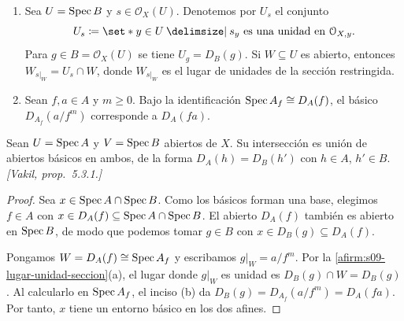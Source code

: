 \begin{afirm}
\label{afirm:s09-lugar-unidad-seccion}
\begin{enumerate}[label=(\alph*)]
\item Sea $U=\operatorname{Spec} B$ y $s\in\mathcal O_X(U)$. Denotemos por $U_s$ el conjunto
\[
U_s\coloneqq\set*{y\in U\given s_y\text{ es una unidad en }\mathcal O_{X,y}}.
\]
Para $g\in B=\mathcal O_X(U)$ se tiene $U_g=D_B(g)$. Si $W\subseteq U$ es abierto, entonces $W_{s|_W}=U_s\cap W$, donde $W_{s|_W}$ es el lugar de unidades de la sección restringida.
\item Sean $f,a\in A$ y $m\ge0$. Bajo la identificación $\operatorname{Spec} A_f\cong D_A(f)$, el básico $D_{A_f}(a/f^m)$ corresponde a $D_A(fa)$.
\end{enumerate}
\end{afirm}

\begin{lema}
\label{lema:s09-interseccion-afines}
Sean $U=\operatorname{Spec} A$ y $V=\operatorname{Spec} B$ abiertos de $X$. Su intersección es unión de abiertos básicos en ambos, de la forma $D_A(h)=D_B(h')$ con $h\in A$, $h'\in B$. \emph{[Vakil, prop.~5.3.1.]}
\end{lema}
\begin{proof}
Sea $x\in\operatorname{Spec} A\cap\operatorname{Spec} B$. Como los básicos forman una base, elegimos $f\in A$ con $x\in D_A(f)\subseteq\operatorname{Spec} A\cap\operatorname{Spec} B$. El abierto $D_A(f)$ también es abierto en $\operatorname{Spec} B$, de modo que podemos tomar $g\in B$ con $x\in D_B(g)\subseteq D_A(f)$.

Pongamos $W=D_A(f)\cong\operatorname{Spec} A_f$ y escribamos $g|_W=a/f^m$. Por la \cref{afirm:s09-lugar-unidad-seccion}(a), el lugar donde $g|_W$ es unidad es $D_B(g)\cap W=D_B(g)$. Al calcularlo en $\operatorname{Spec} A_f$, el inciso (b) da $D_B(g)=D_{A_f}(a/f^m)=D_A(fa)$. Por tanto, $x$ tiene un entorno básico en los dos afines.
\end{proof}

\begin{center}
\end{center}

